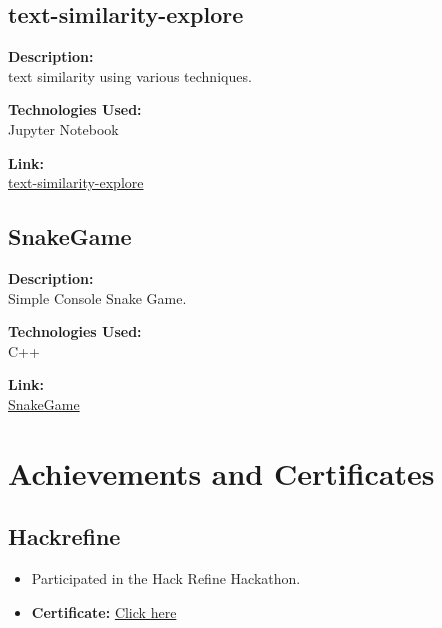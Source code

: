 \documentclass[a4paper,10pt]{article}
\begin{document}
\subsection*{text-similarity-explore}

\noindent
\begin{minipage}[t]{0.4\textwidth}
  \textbf{Description:}\\
  text similarity using various techniques.
\end{minipage}%
\begin{minipage}[t]{0.4\textwidth}
  \textbf{Technologies Used:}\\
  Jupyter Notebook
\end{minipage}%
\begin{minipage}[t]{0.2\textwidth}
  \textbf{Link:}\\
  \href{https://github.com/EchoSingh/text-similarity-explorer}{text-similarity-explore}
\end{minipage}

\subsection*{SnakeGame}

\noindent
\begin{minipage}[t]{0.4\textwidth}
  \textbf{Description:}\\
  Simple Console Snake Game.
\end{minipage}%
\begin{minipage}[t]{0.4\textwidth}
  \textbf{Technologies Used:}\\
  C++
\end{minipage}%
\begin{minipage}[t]{0.2\textwidth}
  \textbf{Link:}\\
  \href{https://github.com/EchoSingh/SnakeGame}{SnakeGame}
\end{minipage}







\section{Achievements and Certificates}

\subsection*{Hackrefine}

\begin{multicols}{2}
    \begin{itemize}
        \item Participated in the Hack Refine Hackathon.
    \end{itemize}
    
    \columnbreak
    
    \begin{itemize}
        \item \textbf{Certificate:} \href{https://acrobat.adobe.com/link/review?uri=urn:aaid:scds:US:2e58002b-6058-312f-8fc2-a18b5f35ada0}{Click here}
    \end{itemize}
\end{multicols}
\end{document}
